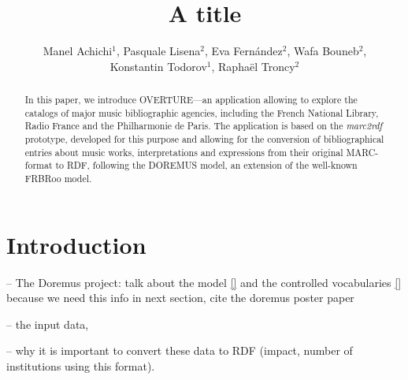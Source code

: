 \documentclass[runningheads,a4paper]{llncs}
\begin{document}
\title{A title}


\author{Manel Achichi$^1$, Pasquale Lisena$^2$, Eva Fern\'{a}ndez$^2$, Wafa Bouneb$^2$, \\ Konstantin Todorov$^1$, Rapha\"{e}l Troncy$^2$}

\maketitle


\begin{abstract}
In this paper, we introduce OVERTURE---an application allowing to explore the catalogs of major music bibliographic agencies, including the French National Library, Radio France and the Philharmonie de Paris. The application is based on the {\it marc2rdf} prototype, developed for this purpose and allowing for the conversion of bibliographical entries about music works, interpretations and expressions from their original MARC-format to RDF, following the DOREMUS model, an extension of the well-known FRBRoo model.
\end{abstract}


\section{Introduction}
\label{sec:introduction}

-- The Doremus project: talk about the model \ref{} and the controlled vocabularies \ref{} because we need this info in next section, cite the doremus poster paper \cite{achichi2015doremus}

-- the input data,

-- why it is important to convert these data to RDF (impact, number of institutions using this format).

\end{document}
